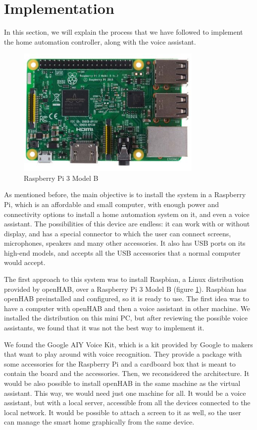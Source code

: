 \bigskip
\section{Implementation}
In this section, we will explain the process that we have followed to implement the home automation controller, along with the voice
assistant.

\begin{figure}
    \centering
    \includegraphics[width=0.8\textwidth]{images/Chapter_07/raspberry-pi-3b.jpg}
    \caption{Raspberry Pi 3 Model B}
    \label{fig:raspberry-pi-3b}
\end{figure}

As mentioned before, the main objective is to install the system in a Raspberry Pi, which is an affordable and small computer,
with enough power and connectivity options to install a home automation system on it, and even a voice assistant. The possibilities
of this device are endless: it can work with or without display, and has a special connector to which the user can connect screens,
microphones, speakers and many other accessories. It also has USB ports on its high-end models, and accepts all the USB
accessories that a normal computer would accept.\cite{raspberryPiDocs}

The first approach to this system was to install Raspbian, a Linux distribution provided by openHAB, over a Raspberry Pi 3 Model B
(figure \ref{fig:raspberry-pi-3b}). Raspbian has openHAB preinstalled and configured, so it is ready to use. The first idea was to
have a computer with openHAB and then a voice assistant in other machine. We installed the distribution on this mini PC, but after
reviewing the possible voice assistants, we found that it was not the best way to implement it.

We found the Google AIY Voice Kit, which is a kit provided by Google to makers that want to play around with voice recognition.
They provide a package with some accessories for the Raspberry Pi and a cardboard box that is meant to contain the board and the
accessories. Then, we reconsidered the architecture. It would be also possible to install openHAB in the same machine as the virtual
assistant. This way, we would need just one machine for all. It would be a voice assistant, but with a local server, accessible from
all the devices connected to the local network. It would be possible to attach a screen to it as well, so the user can manage the
smart home graphically from the same device.

